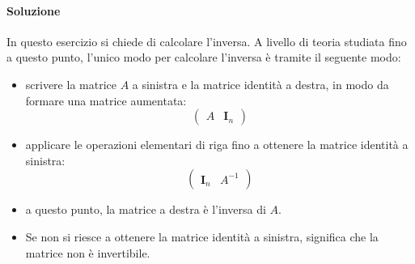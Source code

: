 \documentclass{article}
\theoremstyle{plain}
\theoremstyle{definition}
\theoremstyle{remark}
\begin{document}
\paragraph{Soluzione}
In questo esercizio si chiede di calcolare l'inversa. A livello di teoria studiata fino a questo punto, l'unico modo per calcolare l'inversa è tramite il seguente modo:
\begin{itemize}
    \item scrivere la matrice $A$ a sinistra e la matrice identità a destra, in modo da formare una matrice aumentata:
    \[
    \begin{pmatrix}
    A & \mathbf{I}_n
    \end{pmatrix}
    \]
    \item applicare le operazioni elementari di riga fino a ottenere la matrice identità a sinistra:
    \[
    \begin{pmatrix}
        \mathbf{I}_n & A^{-1}
    \end{pmatrix}
    \]
    \item a questo punto, la matrice a destra è l'inversa di $A$. 
    \item Se non si riesce a ottenere la matrice identità a sinistra, significa che la matrice non è invertibile.
\end{itemize}
\end{document}

